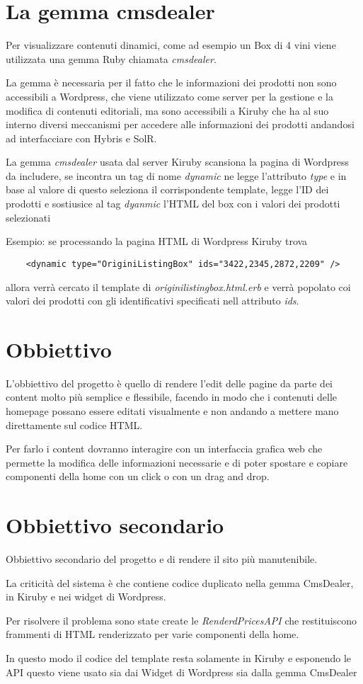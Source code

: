 
\section{La gemma cmsdealer}
Per visualizzare contenuti dinamici, come ad esempio un Box di 4 vini viene utilizzata
una gemma Ruby chiamata \emph{cmsdealer}.

La gemma è necessaria per il fatto che le informazioni dei prodotti non sono accessibili a Wordpress, che viene utilizzato
come server per la gestione e la modifica di contenuti editoriali, ma sono accessibili a Kiruby che ha al suo interno diversi
meccanismi per accedere alle informazioni dei prodotti andandosi ad interfacciare con Hybris e SolR.

La gemma \emph{cmsdealer} usata dal server Kiruby scansiona la pagina di Wordpress da includere,
se incontra un tag di nome \emph{dynamic} ne legge l'attributo \emph{type} e in base al valore di questo
seleziona il corrispondente template, legge l'ID dei prodotti e sostiusice al tag \emph{dyanmic} l'HTML del box con
i valori dei prodotti selezionati

Esempio: se processando la pagina HTML di Wordpress Kiruby trova
\begin{verbatim}
	<dynamic type="OriginiListingBox" ids="3422,2345,2872,2209" />
\end{verbatim}
allora verrà cercato il template di \emph{originilistingbox.html.erb} e verrà popolato
coi valori dei prodotti con gli identificativi specificati nell attributo \emph{ids}.

\newpage
\section{Obbiettivo}
L'obbiettivo del progetto è quello di rendere l'edit delle pagine
da parte dei content molto più semplice e flessibile,
facendo in modo che i contenuti delle homepage possano essere editati visualmente e non
andando a mettere mano direttamente sul codice HTML.

Per farlo i content dovranno interagire con un interfaccia grafica web che permette
la modifica delle informazioni necessarie e di poter spostare e copiare
componenti della home con un click o con un drag and drop.

\section{Obbiettivo secondario}
Obbiettivo secondario del progetto e di rendere il sito più manutenibile.

La criticità del sistema è che contiene codice duplicato nella gemma CmsDealer, in Kiruby
e nei widget di Wordpress. 

Per risolvere il problema sono state create le  \emph{RenderdPricesAPI} 
che restituiscono frammenti di HTML renderizzato per varie componenti della home.

In questo modo il codice del template resta solamente in Kiruby e esponendo le 
API questo viene usato sia dai Widget di Wordpress sia dalla gemma CmsDealer
